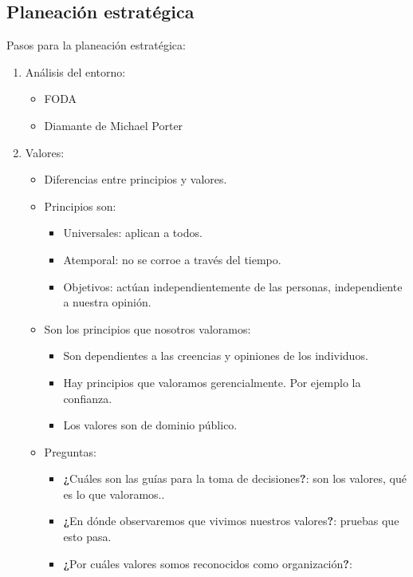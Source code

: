\subsection{Planeación estratégica}

Pasos para la planeación estratégica: 
\begin{enumerate}
    \item Análisis del entorno:
        \begin{itemize}
            \item FODA 
            \item Diamante de Michael Porter
        \end{itemize}

    \item Valores: 
        \begin{itemize}
            \item Diferencias entre principios y valores.
            \item Principios son: 
                \begin{itemize}
                    \item Universales: aplican a todos.
                    \item Atemporal: no se corroe a través del tiempo.
                    \item Objetivos: actúan independientemente de las personas, independiente a nuestra opinión.
                \end{itemize}
            
            \item Son los principios que nosotros valoramos:
                \begin{itemize}
                    \item Son dependientes a las creencias y opiniones de los individuos.
                    \item Hay principios que valoramos gerencialmente. Por ejemplo la confianza.
                    \item Los valores son de dominio público.
                \end{itemize}
            
            \item Preguntas:
                \begin{itemize}
                    \item \textbf{¿}Cuáles son las guías para la toma de decisiones\textbf{?}: son los valores, qué es lo que valoramos..
                    \item \textbf{¿}En dónde observaremos que vivimos nuestros valores\textbf{?}: pruebas que esto pasa.
                    \item \textbf{¿}Por cuáles valores somos reconocidos como organización\textbf{?}: 
                \end{itemize}
            

\end{itemize}
\end{enumerate}
